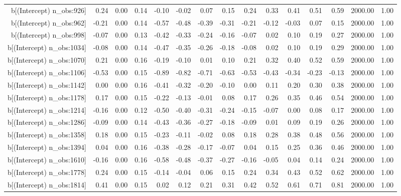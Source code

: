 \begin{table}[ht]
\begin{tabular}{rrrrrrrrrrrrrrr}
  b[(Intercept) n\_obs:926] & 0.24 & 0.00 & 0.14 & -0.10 & -0.02 & 0.07 & 0.15 & 0.24 & 0.33 & 0.41 & 0.51 & 0.59 & 2000.00 & 1.00 \\ 
  b[(Intercept) n\_obs:962] & -0.21 & 0.00 & 0.14 & -0.57 & -0.48 & -0.39 & -0.31 & -0.21 & -0.12 & -0.03 & 0.07 & 0.15 & 2000.00 & 1.00 \\ 
  b[(Intercept) n\_obs:998] & -0.07 & 0.00 & 0.13 & -0.42 & -0.33 & -0.24 & -0.16 & -0.07 & 0.02 & 0.10 & 0.19 & 0.27 & 2000.00 & 1.00 \\ 
  b[(Intercept) n\_obs:1034] & -0.08 & 0.00 & 0.14 & -0.47 & -0.35 & -0.26 & -0.18 & -0.08 & 0.02 & 0.10 & 0.19 & 0.29 & 2000.00 & 1.00 \\ 
  b[(Intercept) n\_obs:1070] & 0.21 & 0.00 & 0.16 & -0.19 & -0.10 & 0.01 & 0.10 & 0.21 & 0.32 & 0.40 & 0.52 & 0.59 & 2000.00 & 1.00 \\ 
  b[(Intercept) n\_obs:1106] & -0.53 & 0.00 & 0.15 & -0.89 & -0.82 & -0.71 & -0.63 & -0.53 & -0.43 & -0.34 & -0.23 & -0.13 & 2000.00 & 1.00 \\ 
  b[(Intercept) n\_obs:1142] & 0.00 & 0.00 & 0.16 & -0.41 & -0.32 & -0.20 & -0.10 & 0.00 & 0.11 & 0.20 & 0.30 & 0.38 & 2000.00 & 1.00 \\ 
  b[(Intercept) n\_obs:1178] & 0.17 & 0.00 & 0.15 & -0.22 & -0.13 & -0.01 & 0.08 & 0.17 & 0.26 & 0.35 & 0.46 & 0.54 & 2000.00 & 1.00 \\ 
  b[(Intercept) n\_obs:1214] & -0.16 & 0.00 & 0.12 & -0.50 & -0.40 & -0.31 & -0.24 & -0.15 & -0.07 & 0.00 & 0.08 & 0.17 & 2000.00 & 1.00 \\ 
  b[(Intercept) n\_obs:1286] & -0.09 & 0.00 & 0.14 & -0.43 & -0.36 & -0.27 & -0.18 & -0.09 & 0.01 & 0.09 & 0.19 & 0.26 & 2000.00 & 1.00 \\ 
  b[(Intercept) n\_obs:1358] & 0.18 & 0.00 & 0.15 & -0.23 & -0.11 & -0.02 & 0.08 & 0.18 & 0.28 & 0.38 & 0.48 & 0.56 & 2000.00 & 1.00 \\ 
  b[(Intercept) n\_obs:1394] & 0.04 & 0.00 & 0.16 & -0.38 & -0.28 & -0.17 & -0.07 & 0.04 & 0.15 & 0.25 & 0.36 & 0.46 & 2000.00 & 1.00 \\ 
  b[(Intercept) n\_obs:1610] & -0.16 & 0.00 & 0.16 & -0.58 & -0.48 & -0.37 & -0.27 & -0.16 & -0.05 & 0.04 & 0.14 & 0.24 & 2000.00 & 1.00 \\ 
  b[(Intercept) n\_obs:1778] & 0.24 & 0.00 & 0.15 & -0.14 & -0.04 & 0.06 & 0.15 & 0.24 & 0.34 & 0.43 & 0.52 & 0.62 & 2000.00 & 1.00 \\ 
  b[(Intercept) n\_obs:1814] & 0.41 & 0.00 & 0.15 & 0.02 & 0.12 & 0.21 & 0.31 & 0.42 & 0.52 & 0.61 & 0.71 & 0.81 & 2000.00 & 1.00 \\ 

\end{tabular}
\end{table}

